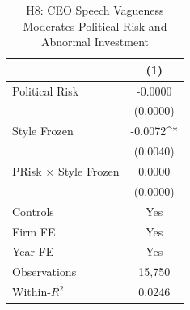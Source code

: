 \begin{table}[htbp]
\centering
\caption{H8: CEO Speech Vagueness Moderates Political Risk and Abnormal Investment}
\label{tab:h8_political_risk}
\small
\begin{tabular}{lc}
\toprule
 & (1) \\
\midrule
Political Risk & -0.0000 \\
 & (0.0000) \\
Style Frozen & -0.0072^{*} \\
 & (0.0040) \\
PRisk $\times$ Style Frozen & 0.0000 \\
 & (0.0000) \\
\midrule
Controls & Yes \\
Firm FE  & Yes \\
Year FE  & Yes \\
\midrule
Observations & 15,750 \\
Within-$R^2$ & 0.0246 \\
\bottomrule
\end{tabular}
\end{table}